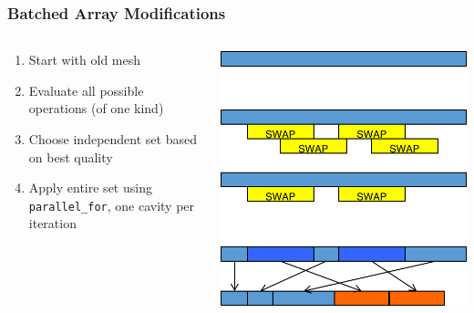 \documentclass{beamer}
\begin{document}
\begin{frame}
\frametitle{Batched Array Modifications}
\begin{columns}[T]
\begin{column}{.5\textwidth}
\begin{enumerate}
\item Start with old mesh
\item Evaluate all possible operations (of one kind)
\item Choose independent set based on best quality
\item Apply entire set using \texttt{parallel\_for}, one cavity per iteration
\end{enumerate}
\end{column}
\begin{column}{.5\textwidth}
\includegraphics[width=\textwidth]{batch_steps.png}
\end{column}
\end{columns}
\end{frame}
\end{document}
